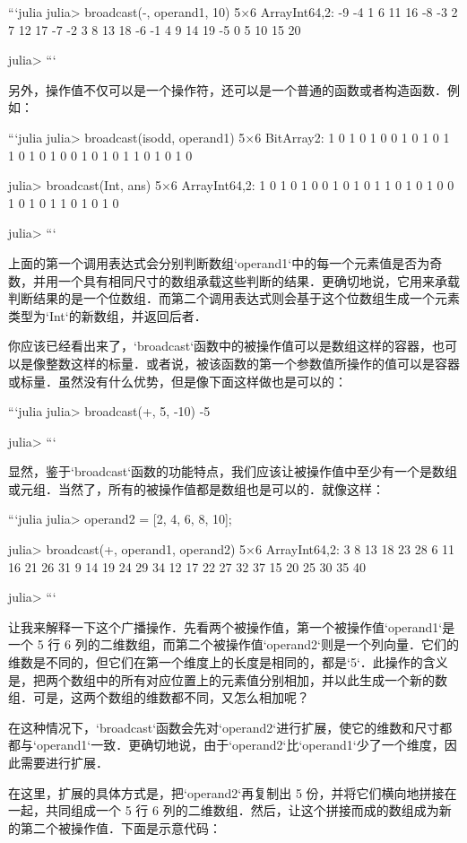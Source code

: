 ```julia
julia> broadcast(-, operand1, 10)
5×6 Array{Int64,2}:
 -9  -4  1   6  11  16
 -8  -3  2   7  12  17
 -7  -2  3   8  13  18
 -6  -1  4   9  14  19
 -5   0  5  10  15  20

julia> 
```

另外，操作值不仅可以是一个操作符，还可以是一个普通的函数或者构造函数．例如：

```julia
julia> broadcast(isodd, operand1)
5×6 BitArray{2}:
 1  0  1  0  1  0
 0  1  0  1  0  1
 1  0  1  0  1  0
 0  1  0  1  0  1
 1  0  1  0  1  0

julia> broadcast(Int, ans)
5×6 Array{Int64,2}:
 1  0  1  0  1  0
 0  1  0  1  0  1
 1  0  1  0  1  0
 0  1  0  1  0  1
 1  0  1  0  1  0

julia> 
```

上面的第一个调用表达式会分别判断数组`operand1`中的每一个元素值是否为奇数，并用一个具有相同尺寸的数组承载这些判断的结果．更确切地说，它用来承载判断结果的是一个位数组．而第二个调用表达式则会基于这个位数组生成一个元素类型为`Int`的新数组，并返回后者．

你应该已经看出来了，`broadcast`函数中的被操作值可以是数组这样的容器，也可以是像整数这样的标量．或者说，被该函数的第一个参数值所操作的值可以是容器或标量．虽然没有什么优势，但是像下面这样做也是可以的：

```julia
julia> broadcast(+, 5, -10)
-5

julia> 
```

显然，鉴于`broadcast`函数的功能特点，我们应该让被操作值中至少有一个是数组或元组．当然了，所有的被操作值都是数组也是可以的．就像这样：

```julia
julia> operand2 = [2, 4, 6, 8, 10];

julia> broadcast(+, operand1, operand2)
5×6 Array{Int64,2}:
  3   8  13  18  23  28
  6  11  16  21  26  31
  9  14  19  24  29  34
 12  17  22  27  32  37
 15  20  25  30  35  40

julia> 
```

让我来解释一下这个广播操作．先看两个被操作值，第一个被操作值`operand1`是一个 5 行 6 列的二维数组，而第二个被操作值`operand2`则是一个列向量．它们的维数是不同的，但它们在第一个维度上的长度是相同的，都是`5`．此操作的含义是，把两个数组中的所有对应位置上的元素值分别相加，并以此生成一个新的数组．可是，这两个数组的维数都不同，又怎么相加呢？

在这种情况下，`broadcast`函数会先对`operand2`进行扩展，使它的维数和尺寸都都与`operand1`一致．更确切地说，由于`operand2`比`operand1`少了一个维度，因此需要进行扩展．

在这里，扩展的具体方式是，把`operand2`再复制出 5 份，并将它们横向地拼接在一起，共同组成一个 5 行 6 列的二维数组．然后，让这个拼接而成的数组成为新的第二个被操作值．下面是示意代码：

